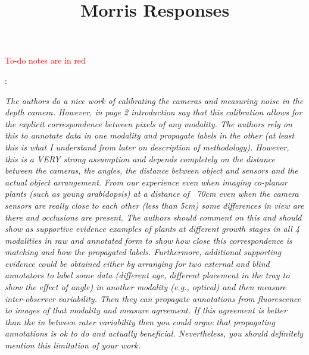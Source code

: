\documentclass[11pt,letterpaper]{article}
\title{Morris Responses}
\newcommand\todo[1]{\textcolor{red}{#1}}
\newcounter{reviewcounter}
\newenvironment{review}
{\noindent {\bf Comment~\arabic{reviewcounter}}:\addtocounter{reviewcounter}{1}\itshape}
{\vspace{0.8em}}
\begin{document}
\maketitle

\todo{To-do notes are in red}

\begin{review}
The authors do a nice work of calibrating the cameras and measuring noise in the depth camera. However, in page 2 introduction say that this calibration allows for the explicit correspondence between pixels of any modality.  The authors rely on this to annotate data in one modality and propagate labels in the other (at least this is what I understand from later on description of methodology).  However, this is a VERY strong assumption and depends completely on the distance between the cameras, the angles, the distance between object and sensors and the actual object arrangement. From our experience even when imaging co-planar plants (such as young arabidopsis) at a distance of ~70cm even when the camera sensors are really close to each other (less than 5cm) some differences in view are there and occlusions are present.  The authors should comment on this and should show as supportive evidence examples of plants at different growth stages in all 4 modalities in raw and
annotated form to show how close this correspondence is matching and how the propagated labels.  Furthermore, additional supporting evidence could be obtained either by arranging for two external and blind annotators
to label some data (different age, different placement in the tray to show the effect of angle) in another modality (e.g., optical) and then measure inter-observer variability. Then they can propagate annotations from fluorescence to images of that modality and measure agreement. If this agreement is better than the in between rater variability then you could argue that propagating annotations is ok to do and actually beneficial.  Nevertheless, you should definitely mention this limitation of your work. 
\end{review}
\end{document}
